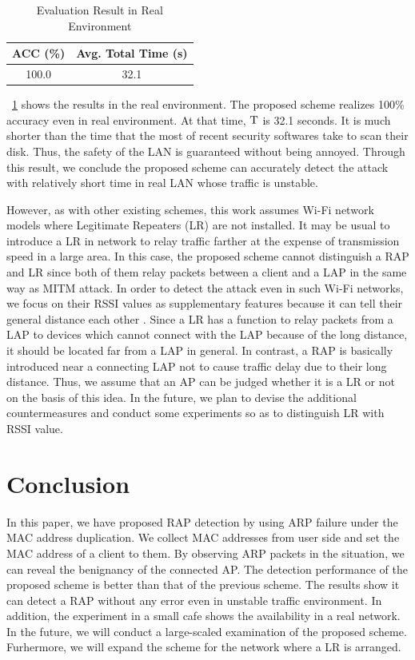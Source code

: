 \documentclass[paper]{ieice}
\begin{document}
\begin{table}[t] 
    \begin{center}
        \caption{Evaluation Result in Real Environment}
        \label{tab:real}
        \begin{tabular}{c c} \hline
            ACC (\%) & Avg. Total Time (s) \\ \hline \hline
            100.0 & 32.1 \\ \hline
        \end{tabular}
    \end{center}
    \vspace{-2zh}
\end{table}

\tablename~\ref{tab:real} shows the results in the real environment.
The proposed scheme realizes 100\% accuracy even in real environment.
At that time, $\rm T$ is 32.1 seconds.
It is much shorter than the time that the most of recent security softwares take to scan their disk.
Thus, the safety of the LAN is guaranteed without being annoyed.
Through this result, we conclude the proposed scheme can accurately detect the attack with relatively short time in real LAN whose traffic is unstable.

However, as with other existing schemes, this work assumes Wi-Fi network models where Legitimate Repeaters (LR) are not installed.
It may be usual to introduce a LR in network to relay traffic farther at the expense of transmission speed in a large area.
In this case, the proposed scheme cannot distinguish a RAP and LR since both of them relay packets between a client and a LAP in the same way as MITM attack.
In order to detect the attack even in such Wi-Fi networks, we focus on their RSSI values as supplementary features because it can tell their general distance each other \cite{rssi}.
Since a LR has a function to relay packets from a LAP to devices which cannot connect with the LAP because of the long distance, it should be located far from a LAP in general.
In contrast, a RAP is basically introduced near a connecting LAP not to cause traffic delay due to their long distance.
Thus, we assume that an AP can be judged whether it is a LR or not on the basis of this idea.
In the future, we plan to devise the additional countermeasures and conduct some experiments so as to distinguish LR with RSSI value.

\section{Conclusion}\label{sec:6}
In this paper, we have proposed RAP detection by using ARP failure under the MAC address duplication.
We collect MAC addresses from user side and set the MAC address of a client to them.
By observing ARP packets in the situation, we can reveal the benignancy of the connected AP.
The detection performance of the proposed scheme is better than that of the previous scheme.
The results show it can detect a RAP without any error even in unstable traffic environment.
In addition, the experiment in a small cafe shows the availability in a real network.
In the future, we will conduct a large-scaled examination of the proposed scheme.
Furhermore, we will expand the scheme for the network where a LR is arranged.
\end{document}

